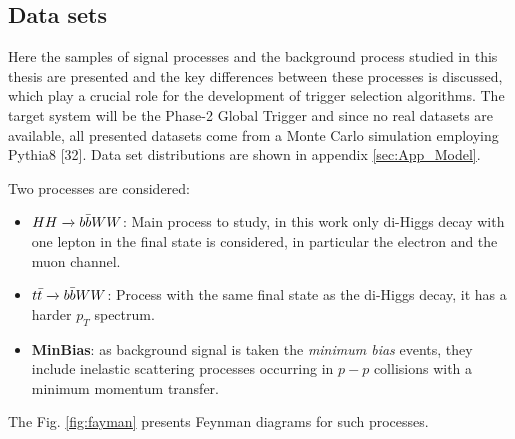 \documentclass[../../main.tex]{subfiles}
\begin{document}
\subsection{Data sets}
\label{sec:NN-dataset}
Here the samples of signal processes and the background process studied in this thesis are presented and the key differences between these processes is discussed, which
play a crucial role for the development of trigger selection algorithms. The target system will be the Phase-2 Global Trigger and since no real datasets are available, all presented datasets come from a Monte Carlo simulation employing Pythia8 [32]. Data set distributions are shown in appendix \ref{sec:App_Model}.

Two processes are considered:
\begin{itemize}
    \item \textbf{$HH \xrightarrow{} b \Bar{b}WW$}: Main process to study, in this work only di-Higgs decay with one lepton in the final state is considered, in particular the electron and the muon channel.
    \item \textbf{$t\Bar{t} \xrightarrow{} b \Bar{b}WW$}: Process with the same final state as the di-Higgs decay, it has a harder $p_T$ spectrum.
    \item \textbf{MinBias}: as background signal is taken the \textit{minimum bias} events, they include inelastic scattering processes occurring in $p-p$ collisions with a minimum momentum transfer. 
\end{itemize}

The Fig. \ref{fig:fayman} presents Feynman diagrams for such processes.

%    
\end{document}
